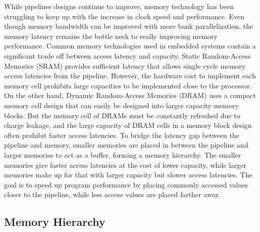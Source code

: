 While pipelines designs continue to improve, memory technology has been struggling to keep up with the increase in clock speed and performance.
Even though memory bandwidth can be improved with more bank parallelization, the memory latency remains the bottle neck to really improving memory performance.
Common memory technologies used in embedded systems contain a significant trade off between access latency and capacity. 
Static Random-Access Memories (SRAM) provides sufficient latency that allows single cycle memory access latencies from the pipeline.
However, the hardware cost to implement each memory cell prohibits large capacities to be implemented close to the processor.
On the other hand, Dynamic Random-Access Memories (DRAM) uses a compact memory cell design that can easily be designed into larger capacity memory blocks.
But the memory cell of DRAMs must be constantly refreshed due to charge leakage, and the large capacity of DRAM cells in a memory block design often prohibit faster access latencies.
To bridge the latency gap between the pipeline and memory, smaller memories are placed in between the pipeline and larger memories to act as a buffer, forming a memory hierarchy.
The smaller memories give faster access latencies at the cost of lower capacity, while larger memories make up for that with larger capacity but slower access latencies. 
The goal is to speed up program performance by placing commonly accessed values closer to the pipeline, while less access values are placed farther away.

\subsection{Memory Hierarchy}
